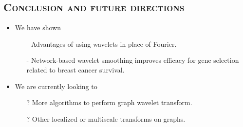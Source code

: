 \documentclass[xcolor=x11names,compress]{beamer}
\theoremstyle{plain}
\renewcommand{\(}{\begin{columns}}
\renewcommand{\)}{\end{columns}}
\newcommand{\<}[1]{\begin{column}{#1}}
\renewcommand{\>}{\end{column}}
\begin{document}
\subsection{\scshape Conclusion and future directions}
\begin{frame}{\insertsubsection}
	
	\begin{itemize}
		\item We have shown
		\begin{itemize}
			\item[-] Advantages of using wavelets in place of Fourier.
			\item[-] Network-based wavelet smoothing improves efficacy for gene selection related to breast cancer survival.
		\end{itemize}
		
		\pause
		
		\item We are currently looking to
		\begin{itemize}
			\item[$?$] More algorithms to perform graph wavelet transform.
			\item[$?$] Other localized or multiscale transforms on graphs.
		\end{itemize}
	\end{itemize}
	
\end{frame}
\end{document}
